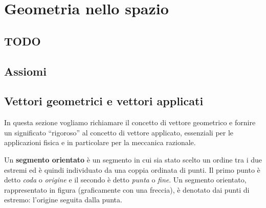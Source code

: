 
\chapter{Geometria nello spazio}

\section{TODO}

\section{Assiomi}
\label{sec:3D_assiomi}

% 

\section{Vettori geometrici e vettori applicati}

In questa sezione vogliamo richiamare il concetto di vettore geometrico e 
fornire
un significato ``rigoroso'' al concetto di vettore applicato, essenziali per le 
applicazioni 
fisica e in particolare per la meccanica razionale. 

\begin{definition}
  Un {\bf segmento orientato} \`e un segmento in cui sia stato scelto un ordine 
tra i due
  estremi ed \`e quindi individuato da una coppia ordinata di punti. Il primo 
punto \`e detto
  {\it coda} o {\it origine} e il secondo \`e detto {\it punta}  o {\it fine}. 
  Un segmento orientato, rappresentato in figura (graficamente con una 
freccia), 
  \`e denotato dai punti di estremo: l'origine seguita dalla punta.
\begin{figure}[h!]
\begin{center}
{\small
{}
}
\end{center}
\end{figure}
\end{definition}

